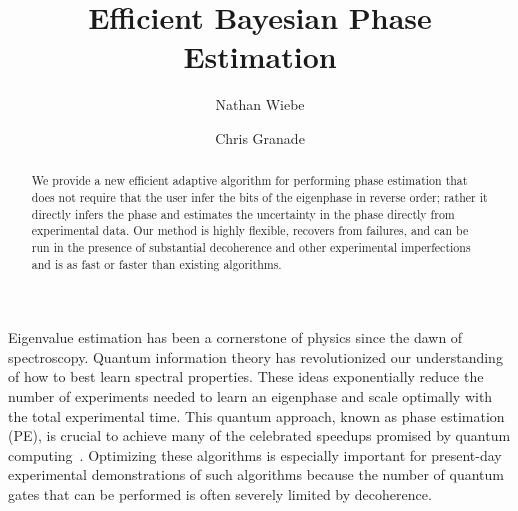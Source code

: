 \documentclass[aps,pra,amsmath,twocolumn,amssymb,superscriptaddress]{revtex4-1}
\begin{document}

\title{Efficient Bayesian Phase Estimation}
\author{Nathan Wiebe}

\author{Chris Granade}

\begin{abstract}
    We provide a new efficient adaptive algorithm for performing phase
    estimation that does not require that the user infer the bits of the
    eigenphase in reverse order; rather it directly infers the phase and
    estimates the uncertainty in the phase directly from experimental data. Our
    method is highly flexible, recovers from failures, and can be run in the
    presence of substantial decoherence and other experimental imperfections
    and is as fast or faster than existing algorithms.
\end{abstract}

\maketitle



Eigenvalue estimation has been a cornerstone of physics since the dawn of spectroscopy.  Quantum information theory has revolutionized our understanding of how to best learn spectral properties.
These ideas exponentially reduce the number of experiments needed to learn an eigenphase and scale optimally with the total experimental time.
This quantum approach, known as phase estimation (PE), is crucial to achieve many of the celebrated speedups promised by quantum computing~\cite{shor_polynomial-time_1995,BHM+02,ADL+05,harrow2009quantum,lanyon2010towards}.  Optimizing these algorithms is especially important for present-day experimental demonstrations of such algorithms because the number of quantum gates that can be performed is often severely limited by decoherence.
\end{document}
